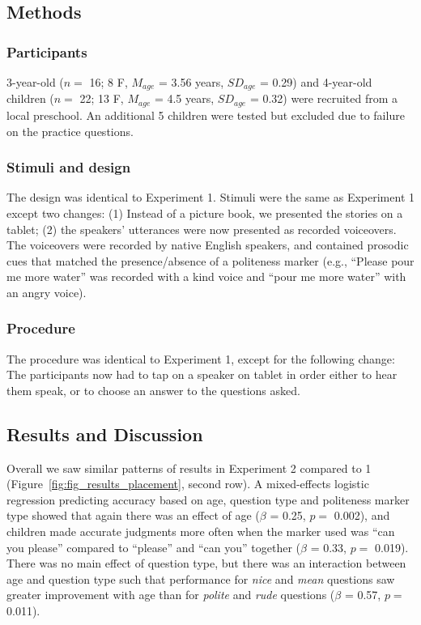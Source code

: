 \documentclass[10pt, letterpaper]{article}
\begin{document}
\subsection{Methods}\label{methods-1}

\subsubsection{Participants}\label{participants-1}

3-year-old (\(n=\) 16; 8 F, \(M_{age}\) = 3.56 years, \(SD_{age}\) =
0.29) and 4-year-old children (\(n=\) 22; 13 F, \(M_{age}\) = 4.5 years,
\(SD_{age}\) = 0.32) were recruited from a local preschool. An
additional 5 children were tested but excluded due to failure on the
practice questions.

\subsubsection{Stimuli and design}\label{stimuli-and-design-1}

The design was identical to Experiment 1. Stimuli were the same as
Experiment 1 except two changes: (1) Instead of a picture book, we
presented the stories on a tablet; (2) the speakers' utterances were now
presented as recorded voiceovers. The voiceovers were recorded by native
English speakers, and contained prosodic cues that matched the
presence/absence of a politeness marker (e.g., ``Please pour me more
water'' was recorded with a kind voice and ``pour me more water'' with
an angry voice).

\subsubsection{Procedure}\label{procedure-1}

The procedure was identical to Experiment 1, except for the following
change: The participants now had to tap on a speaker on tablet in order
either to hear them speak, or to choose an answer to the questions
asked.

\subsection{Results and Discussion}\label{results-and-discussion-1}

Overall we saw similar patterns of results in Experiment 2 compared to 1
(Figure~\ref{fig:fig_results_placement}, second row). A mixed-effects
logistic regression predicting accuracy based on age, question type and
politeness marker type showed that again there was an effect of age
(\(\beta\) = 0.25, \(p =\) 0.002), and children made accurate judgments
more often when the marker used was ``can you please'' compared to
``please'' and ``can you'' together (\(\beta\) = 0.33, \(p =\) 0.019).
There was no main effect of question type, but there was an interaction
between age and question type such that performance for \emph{nice} and
\emph{mean} questions saw greater improvement with age than for
\emph{polite} and \emph{rude} questions (\(\beta\) = 0.57, \(p =\)
0.011).
\end{document}
